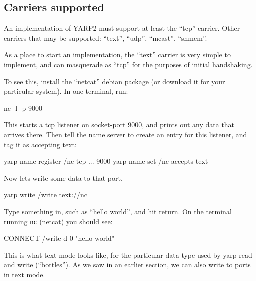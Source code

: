 \documentclass[a4]{article}
\begin{document}






\subsection{Carriers supported}

An implementation of YARP2 must support at least the ``tcp'' carrier.
Other carriers that may be supported:
``text'', ``udp'', ``mcast'', ``shmem''.

As a place to start an implementation, the ``text'' carrier is very
simple to implement, and can masquerade as ``tcp'' for the purposes
of initial handshaking.

To see this, install the ``netcat'' debian package (or download it
for your particular system).  In one terminal, run:
%
\begin{code}
nc -l -p 9000
\end{code}
%
This starts a tcp listener on socket-port 9000, and prints out
any data that arrives there.  Then tell the name server to
create an entry for this listener, and tag it as accepting text:
%
\begin{code}
yarp name register /nc tcp ... 9000
yarp name set /nc accepts text
\end{code}
%
Now lets write some data to that port.
%
\begin{code}
yarp write /write text://nc
\end{code}
%
Type something in, such as ``hello world'', and hit return.
On the terminal running {\tt nc} (netcat) you should see:
%
\begin{code}
CONNECT /write
d
0 "hello world"
\end{code}
%
This is what text mode looks like, for the particular
data type used by yarp read and write (``bottles'').  
As we saw in an earlier section, we can also write to ports in text mode.
\end{document}
